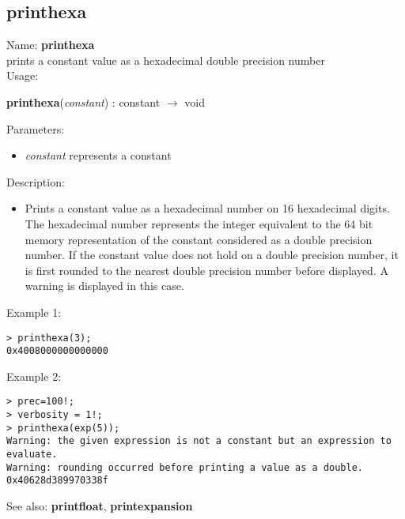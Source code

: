 \subsection{ printhexa }
\noindent Name: \textbf{printhexa}\\
prints a constant value as a hexadecimal double precision number\\

\noindent Usage: 
\begin{center}
\textbf{printhexa}(\emph{constant}) : \textsf{constant} $\rightarrow$ \textsf{void}\\
\end{center}
Parameters: 
\begin{itemize}
\item \emph{constant} represents a constant
\end{itemize}
\noindent Description: \begin{itemize}

\item Prints a constant value as a hexadecimal number on 16 hexadecimal
   digits. The hexadecimal number represents the integer equivalent to
   the 64 bit memory representation of the constant considered as a
   double precision number.
   If the constant value does not hold on a double precision number, it
   is first rounded to the nearest double precision number before
   displayed. A warning is displayed in this case.
\end{itemize}
\noindent Example 1: 
\begin{center}\begin{minipage}{15cm}\begin{Verbatim}[frame=single]
> printhexa(3);
0x4008000000000000
\end{Verbatim}
\end{minipage}\end{center}
\noindent Example 2: 
\begin{center}\begin{minipage}{15cm}\begin{Verbatim}[frame=single]
> prec=100!;
> verbosity = 1!;
> printhexa(exp(5));
Warning: the given expression is not a constant but an expression to evaluate.
Warning: rounding occurred before printing a value as a double.
0x40628d389970338f
\end{Verbatim}
\end{minipage}\end{center}
See also: \textbf{printfloat}, \textbf{printexpansion}
